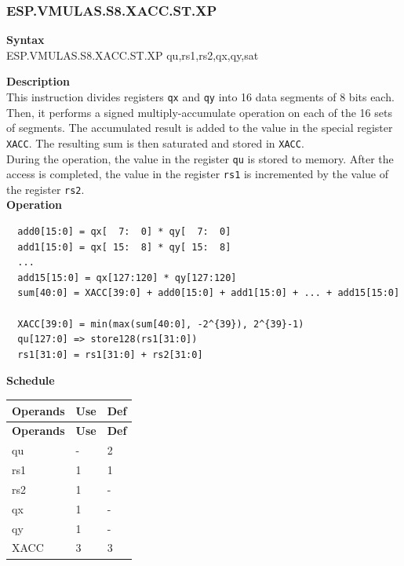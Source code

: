 \newpage
\subsubsection{ESP.VMULAS.S8.XACC.ST.XP}\label{instruction:ESPVMULASS8XACCSTXP}
\textbf{Syntax}\\
ESP.VMULAS.S8.XACC.ST.XP qu,rs1,rs2,qx,qy,sat

\textbf{Description}\\
This instruction divides registers \lstinline{qx} and \lstinline{qy} into 16 data segments of 8 bits each. Then, it performs a signed multiply-accumulate operation on each of the 16 sets of segments. The accumulated result is added to the value in the special register \lstinline{XACC}. The resulting sum is then saturated and stored in \lstinline{XACC}. \\ During the operation, the value in the register \lstinline{qu} is stored to memory. After the access is completed, the value in the register \lstinline{rs1} is incremented by the value of the register \lstinline{rs2}.\\
\textbf{Operation}
\begin{lstlisting}
  add0[15:0] = qx[  7:  0] * qy[  7:  0]
  add1[15:0] = qx[ 15:  8] * qy[ 15:  8]
  ...
  add15[15:0] = qx[127:120] * qy[127:120]
  sum[40:0] = XACC[39:0] + add0[15:0] + add1[15:0] + ... + add15[15:0]

  XACC[39:0] = min(max(sum[40:0], -2^{39}), 2^{39}-1)
  qu[127:0] => store128(rs1[31:0])
  rs1[31:0] = rs1[31:0] + rs2[31:0]
\end{lstlisting}

\textbf{Schedule}\\
\begin{longtable}[c]{|l|l|l|}
    \hline
    \rowcolor{lightgray}
    \textbf{Operands} & \textbf{Use} & \textbf{Def} \\\hline
    \endfirsthead
    \hline
    \rowcolor{lightgray}
     \textbf{Operands} & \textbf{Use} & \textbf{Def} \\\hline
    \endhead
    \hline
    \endfoot

    qu & - & 2 \\\hline
    rs1 & 1 & 1 \\\hline
    rs2 & 1 & - \\\hline
     qx & 1 & - \\\hline
     qy & 1 & - \\\hline
     XACC & 3 & 3

\end{longtable}

